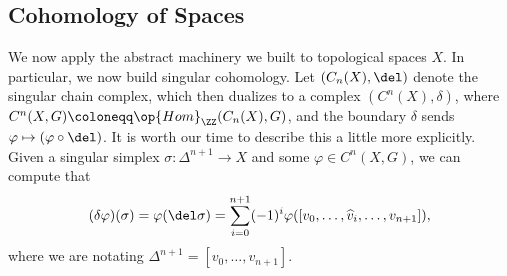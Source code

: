 \documentclass[../notes.tex]{subfiles}
\begin{document}
\subsection{Cohomology of Spaces}
We now apply the abstract machinery we built to topological spaces $X$. In particular, we now build singular cohomology. Let $(C_n(X),\del)$ denote the singular chain complex, which then dualizes to a complex $(C^n(X),\delta)$, where $C^n(X,G)\coloneqq\op{Hom}_\ZZ(C_n(X),G)$, and the boundary $\delta$ sends $\varphi\mapsto(\varphi\circ\del)$. It is worth our time to describe this a little more explicitly. Given a singular simplex $\sigma\colon\Delta^{n+1}\to X$ and some $\varphi\in C^n(X,G)$, we can compute that
\[(\delta\varphi)(\sigma)=\varphi(\del\sigma)=\sum_{i=0}^{n+1}(-1)^i\varphi([v_0,\ldots,\widehat v_i,\ldots,v_{n+1}]),\]
where we are notating $\Delta^{n+1}=[v_0,\ldots,v_{n+1}]$.
\end{document}

